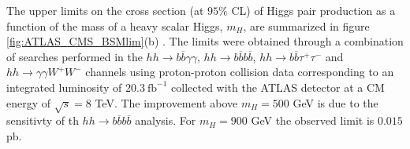 The upper limits on the cross section (at $95\%$ CL) of Higgs pair production as a function of the mass of a heavy scalar Higgs, $m_H$, are summarized in figure \ref{fig:ATLAS_CMS_BSMlim}(b) \cite{ATLAShhBSMcomb}. The limits were obtained through a combination of searches performed in the $hh\rightarrow b\overline{b}\gamma\gamma$, $hh\rightarrow b\overline{b}b\overline{b}$, $hh\rightarrow b\overline{b}\tau^+\tau^-$ and $hh\rightarrow \gamma\gamma W^+W^-$ channels using proton-proton collision data corresponding to an integrated luminosity of $20.3~\text{fb}^{-1}$ collected with the ATLAS detector at a CM energy of $\sqrt{s}=8$ TeV. The improvement above $m_H=500$ GeV is due to the sensitivty of th $hh\rightarrow b\overline{b}b\overline{b}$ analysis. For $m_H=900$ GeV the observed limit is $0.015$ pb.


